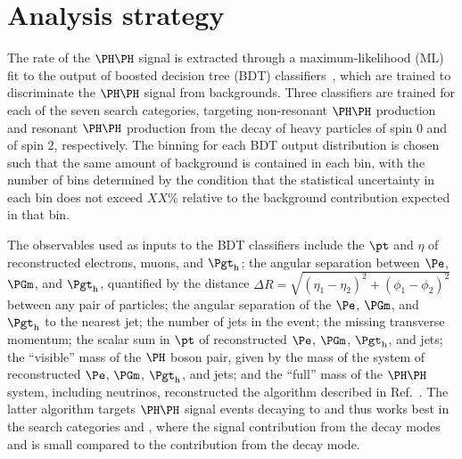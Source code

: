 \section{Analysis strategy}
\label{sec:analysisStrategy}

The rate of the $\HH$ signal is extracted through a maximum-likelihood (ML) fit to
the output of boosted decision tree (BDT) classifiers~\cite{Breiman:1984jka},
which are trained to discriminate the $\HH$ signal from backgrounds.
Three classifiers are trained for each of the seven search categories,
targeting non-resonant $\HH$ production and resonant $\HH$ production from
the decay of heavy particles of spin $0$ and of spin $2$, respectively.
The binning for each BDT output distribution is chosen such that the same
amount of background is contained in each bin, with the number of bins
determined by the condition that the statistical uncertainty in each bin does
not exceed $XX\%$ relative to the background contribution expected in that bin.  %

The observables used as inputs to the BDT classifiers include
the $\pt$ and $\eta$ of reconstructed electrons, muons, and $\tauh$;
the angular separation between $\Pe$, $\PGm$, and $\tauh$,
quantified by the distance $\Delta R = \sqrt{(\eta_{1} - \eta_{2})^{2} + (\phi_{1} - \phi_{2})^{2}}$ between any pair of particles;
the angular separation of the $\Pe$, $\PGm$, and $\tauh$ to the nearest jet;
the number of jets in the event;
the missing transverse momentum; %
the scalar sum in $\pt$ of reconstructed $\Pe$, $\PGm$, $\tauh$, and jets;
the ``visible'' mass of the $\PHiggs$ boson pair, given by the mass of the system of reconstructed $\Pe$, $\PGm$, $\tauh$, and jets;
and the ``full'' mass of the $\HH$ system, including neutrinos, reconstructed the algorithm described in Ref.~\cite{Ehataht:2018nql}.
The latter algorithm targets $\HH$ signal events decaying to \tttt and thus works best in the search categories \zeroLeptonFourTau and \oneLeptonThreeTau,
where the signal contribution from the decay modes \WWWW and \WWtt is small compared to the contribution from the \tttt decay mode.

